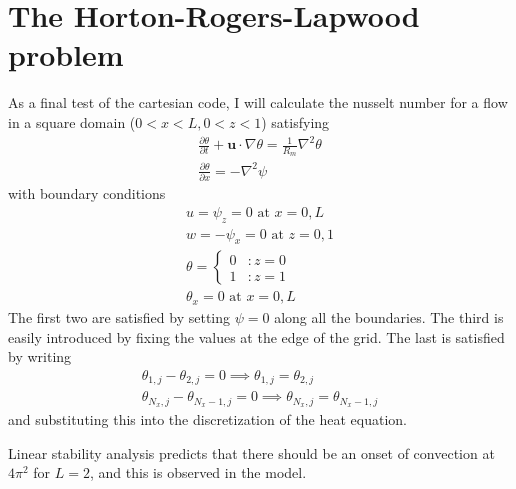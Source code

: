 \documentclass{article}
\begin{document}
\section{The Horton-Rogers-Lapwood problem}
As a final test of the cartesian code, I will calculate the nusselt number for a flow in a square domain ($0<x<L, 0<z<1$) satisfying
\begin{eqnarray}
\frac{\partial \theta}{\partial t} + \mathbf{u} \cdot \nabla \theta = \frac{1}{R_m} \nabla^2 \theta \\
\frac{\partial \theta}{\partial x} = - \nabla^2 \psi
\end{eqnarray}
with boundary conditions
\begin{eqnarray}
u = \psi_z = 0 \text{ at } x=0, L \\
w = -\psi_x = 0 \text{ at } z = 0,1 \\
\theta = \left\{
  \begin{array}{lr}
   0 & : z=0\\
   1 & : z=1
  \end{array}
\right. \\
\theta_x = 0 \text{ at } x=0, L
\end{eqnarray}
The first two are satisfied by setting $\psi = 0$ along all the boundaries.
The third is easily introduced by fixing the values at the edge of the grid.
The last is satisfied by writing
\begin{eqnarray}
\theta_{1,j} - \theta_{2,j} = 0 \implies  \theta_{1,j} = \theta_{2,j}\\
\theta_{N_x,j} - \theta_{N_x - 1, j} = 0 \implies \theta_{N_x,j} = \theta_{N_x - 1, j}
\end{eqnarray}
and substituting this into the discretization of the heat equation.

Linear stability analysis predicts that there should be an onset of convection at $4 \pi^2$ for $L=2$, and this is observed in the model.
\end{document}
